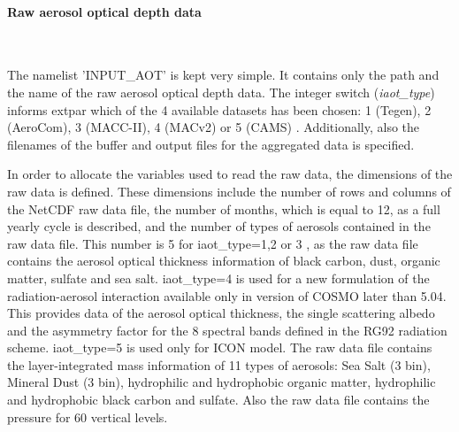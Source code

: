 \documentclass[a4paper,10pt,DIV14,BCOR1cm,titlepage,twoside]{scrartcl}
\begin{document}
\paragraph{Raw aerosol optical depth data}\ \par\medskip\noindent
The namelist 'INPUT\_AOT' is kept very simple. It contains only the path and the name of the raw aerosol optical depth data. The integer switch (\textit{iaot\_type}) informs extpar which of the 4 available datasets has been chosen: 1 (Tegen), 2 (AeroCom), 3 (MACC-II), 4 (MACv2) or 5 (CAMS) . Additionally, also the filenames of the buffer and output files for the aggregated data is specified. \par\medskip\noindent
In order to allocate the variables used to read the raw data, the dimensions of the raw data is defined. These dimensions include the number of rows and columns of the NetCDF raw data file, the number of months, which is equal to 12, as a full yearly cycle is described, and the number of types of aerosols contained in the raw data file. This number is 5 for iaot\_type=1,2 or 3 , as the raw data file contains the aerosol optical thickness information of black carbon, dust, organic matter, sulfate and sea salt. iaot\_type=4 is used for a new formulation of the radiation-aerosol interaction available only in version of COSMO later than 5.04. This provides data of the aerosol optical thickness, the single scattering albedo and the asymmetry factor for the 8 spectral bands defined in the RG92 radiation scheme. 
iaot\_type=5 is used only for ICON model. The raw data file contains the layer-integrated mass information of 11 types of aerosols: Sea Salt (3 bin), Mineral Dust (3 bin), hydrophilic and hydrophobic organic matter, hydrophilic and hydrophobic black carbon and sulfate. Also the raw data file contains the pressure for 60 vertical levels.
\end{document}
